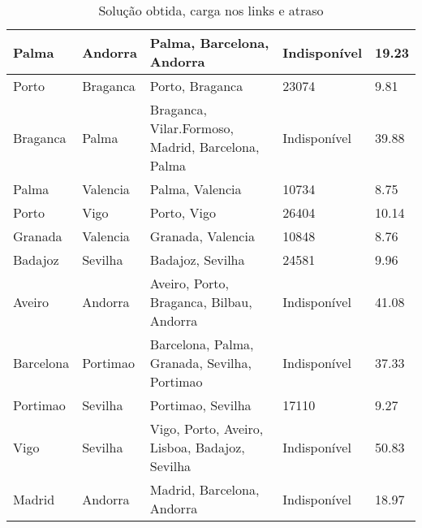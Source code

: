 \begin{table}[!htb]
{\begin{tabular}{|l|l|l|l|l|}
Palma & Andorra & Palma, Barcelona, Andorra & Indisponível & 19.23 \\ \hline
Porto & Braganca & Porto, Braganca & 23074 & 9.81 \\ \hline
Braganca & Palma & Braganca, Vilar.Formoso, Madrid, Barcelona, Palma & Indisponível & 39.88 \\ \hline
Palma & Valencia & Palma, Valencia & 10734 & 8.75 \\ \hline
Porto & Vigo & Porto, Vigo & 26404 & 10.14 \\ \hline
Granada & Valencia & Granada, Valencia & 10848 & 8.76 \\ \hline
Badajoz & Sevilha & Badajoz, Sevilha & 24581 & 9.96 \\ \hline
Aveiro & Andorra & Aveiro, Porto, Braganca, Bilbau, Andorra & Indisponível & 41.08 \\ \hline
Barcelona & Portimao & Barcelona, Palma, Granada, Sevilha, Portimao & Indisponível & 37.33 \\ \hline
Portimao & Sevilha & Portimao, Sevilha & 17110 & 9.27 \\ \hline
Vigo & Sevilha & Vigo, Porto, Aveiro, Lisboa, Badajoz, Sevilha & Indisponível & 50.83 \\ \hline
Madrid & Andorra & Madrid, Barcelona, Andorra & Indisponível & 18.97 \\ \hline
\end{tabular}}
\caption[]{Solução obtida, carga nos links e atraso}
\end{table}

